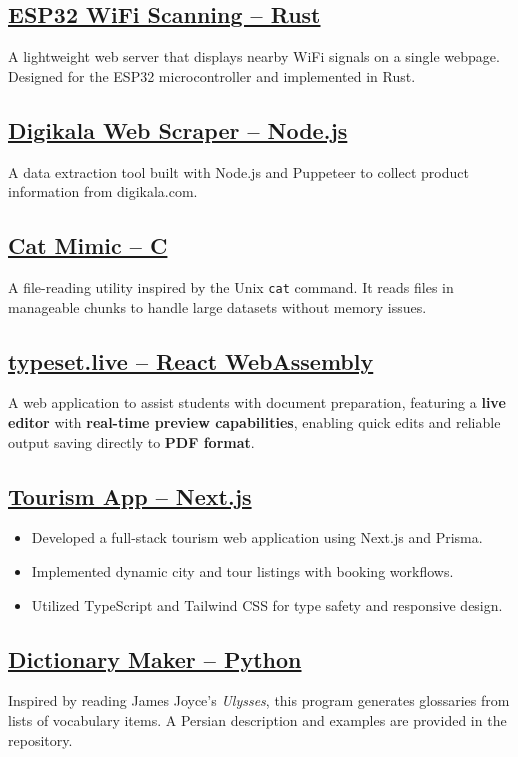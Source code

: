 \documentclass[
10pt, %
]{FreemanCV}
\begin{document}
	\subsection{\href{https://github.com/arashatt/wifi-scan}{ESP32 WiFi Scanning -- Rust}}
	A lightweight web server that displays nearby WiFi signals on a single webpage. Designed for the ESP32 microcontroller and implemented in Rust.

	\subsection{\href{https://github.com/arashatt/digikala-scan}{Digikala Web Scraper -- Node.js}}
	A data extraction tool built with Node.js and Puppeteer to collect product information from digikala.com.

	\subsection{\href{https://github.com/arashatt/cat}{Cat Mimic -- C}}
	A file-reading utility inspired by the Unix \texttt{cat} command. It reads files in manageable chunks to handle large datasets without memory issues.

	\subsection{\href{https://github.com/arashatt/typsy}{typeset.live -- React WebAssembly}}
	A web application to assist students with document preparation, featuring a \textbf{live editor} with \textbf{real-time preview capabilities}, enabling quick edits and reliable output saving directly to \textbf{PDF format}.

	\subsection{\href{https://github.com/arashatt/tourism-nextjs}{Tourism App -- Next.js}}
	\begin{itemize}
		\item Developed a full-stack tourism web application using Next.js and Prisma.
		\item Implemented dynamic city and tour listings with booking workflows.
		\item Utilized TypeScript and Tailwind CSS for type safety and responsive design.
	\end{itemize}

	\subsection{\href{https://github.com/arashatt/Dictionary-maker}{Dictionary Maker -- Python}}
	Inspired by reading James Joyce's \textit{Ulysses}, this program generates glossaries from lists of vocabulary items. A Persian description and examples are provided in the repository.
\end{document}
